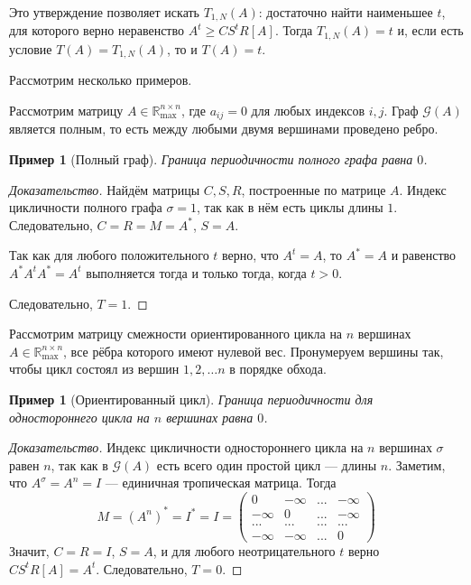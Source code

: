 \documentclass[12pt]{article}
\newtheorem{example}[theorem]{Пример}
\theoremstyle{definition}
\begin{document}
Это утверждение позволяет искать $T_{1, N}(A)$: достаточно найти наименьшее $t$, для которого верно неравенство $A^t \ge CS^tR[A]$. Тогда $T_{1, N}(A) = t$ и, если есть условие $T(A) = T_{1, N}(A)$, то и $T(A) = t$.

Рассмотрим несколько примеров.

Рассмотрим матрицу $A \in \mathbb{R}_{\max}^{n \times n}$, где $a_{ij} = 0$ для любых индексов $i, j$. Граф $\mathcal{G}(A)$ является полным, то есть между любыми двумя вершинами проведено ребро.

\begin{example} [Полный граф]
Граница периодичности полного графа равна $0$.
\end{example}
\begin{proof}[Доказательство]
Найдём матрицы $C, S, R$, построенные по матрице $A$. Индекс цикличности полного графа $\sigma = 1$, так как в нём есть циклы длины $1$. Следовательно, $C = R = M = A^*$, $S = A$.

Так как для любого положительного $t$ верно, что $A^t = A$, то $A^* = A$ и равенство $A^*A^tA^* = A^t$ выполняется тогда и только тогда, когда $t > 0$.

Следовательно, $T = 1$.
\end{proof}

Рассмотрим матрицу смежности ориентированного цикла на $n$ вершинах $A \in \mathbb{R}_{\max}^{n \times n}$, все рёбра которого имеют нулевой вес. Пронумеруем вершины так, чтобы цикл состоял из вершин $1, 2, \dots n$ в порядке обхода.

\begin{example}[Ориентированный цикл]
\label{directedCycleExample}
Граница периодичности для одностороннего цикла на $n$ вершинах равна $0$.
\end{example}
\begin{proof}[Доказательство]
Индекс цикличности одностороннего цикла на $n$ вершинах $\sigma$ равен $n$, так как в $\mathcal{G}(A)$ есть всего один простой цикл --- длины $n$. Заметим, что $A^{\sigma} = A^n = I$ --- единичная тропическая матрица. Тогда
\begin{equation*}
M = (A^n)^* = I^* = I = \begin{pmatrix}
0 & -\infty & ... & -\infty \\
-\infty & 0 & ... & -\infty \\
... & ... & ... & ... \\
-\infty & -\infty & ... & 0
\end{pmatrix}
\end{equation*}
Значит, $C = R = I$, $S = A$, и для любого неотрицательного $t$ верно $CS^tR[A] = A^t$. Следовательно, $T = 0$.
\end{proof}
\end{document}
